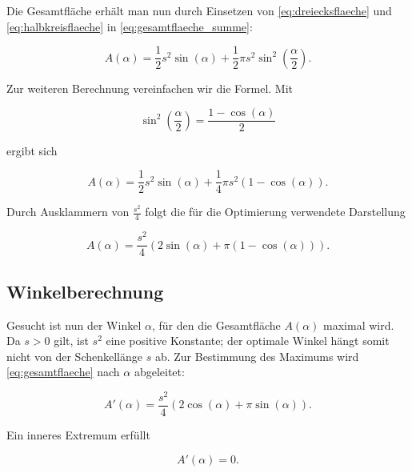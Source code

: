 Die Gesamtfläche erhält man nun durch Einsetzen von
\eqref{eq:dreiecksflaeche} und \eqref{eq:halbkreisflaeche} in
\eqref{eq:gesamtflaeche_summe}:

\begin{equation}
    A(\alpha)
    =
    \frac{1}{2}s^2\sin(\alpha)
    +
    \frac{1}{2}\pi s^2
    \sin^2\left(\frac{\alpha}{2}\right).
    \label{eq:gesamtflaeche_halbwinkel}
\end{equation}

Zur weiteren Berechnung vereinfachen wir die Formel. Mit

\begin{equation}
    \sin^2\left(\frac{\alpha}{2}\right)
    =
    \frac{1-\cos(\alpha)}{2}
\end{equation}

ergibt sich

\begin{equation}
    A(\alpha)
    =
    \frac{1}{2}s^2\sin(\alpha)
    +
    \frac{1}{4}\pi s^2
    \left(1-\cos(\alpha)\right).
\end{equation}

Durch Ausklammern von \(\frac{s^2}{4}\) folgt die für die Optimierung
verwendete Darstellung

\begin{equation}
    A(\alpha)
    =
    \frac{s^2}{4}
    \left(
        2\sin(\alpha)
        +
        \pi\left(1-\cos(\alpha)\right)
    \right).
    \label{eq:gesamtflaeche}
\end{equation}

\subsection{Winkelberechnung}

Gesucht ist nun der Winkel \(\alpha\), für den die Gesamtfläche $A(\alpha)$ maximal wird. Da \(s>0\) gilt, ist \(s^2\) eine positive Konstante; der optimale Winkel hängt somit nicht von der Schenkellänge \(s\) ab. Zur Bestimmung des Maximums wird \eqref{eq:gesamtflaeche} nach \(\alpha\)
abgeleitet:

\begin{equation}
    A'(\alpha)
    =
    \frac{s^2}{4}
    \left(
        2\cos(\alpha)
        +
        \pi\sin(\alpha)
    \right).
    \label{eq:erste_ableitung}
\end{equation}

Ein inneres Extremum erfüllt

\begin{equation}
    A'(\alpha)=0.
\end{equation}

